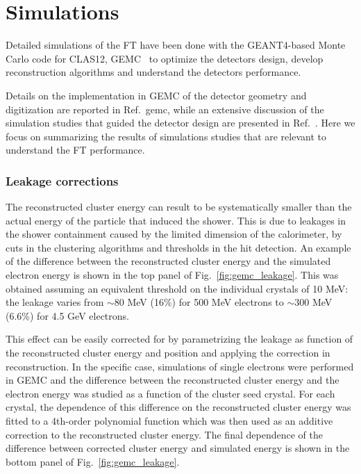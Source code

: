 \section{Simulations}

Detailed simulations of the FT have been done with the
GEANT4-based Monte Carlo code for CLAS12, GEMC~\cite{gemc} 
to optimize the detectors design, develop reconstruction algorithms and understand the detectors performance.

Details on the implementation in GEMC of the detector geometry and digitization are reported in Ref.~{gemc}, while an extensive discussion of the simulation studies that guided the detector design are presented in Ref.~\cite{ft-tdr}. Here we focus on summarizing the results of simulations studies that are relevant to understand the FT performance.

\subsubsection{Leakage corrections}
The reconstructed cluster energy can result to be systematically
smaller than the actual energy of the particle that induced the shower. This is due to leakages in the shower containment caused by the limited dimension of the calorimeter, by cuts in the clustering algorithms and thresholds in the hit detection. An example of the difference between the reconstructed cluster energy and the simulated electron energy is shown in the top panel of Fig.~\ref{fig:gemc_leakage}. This was obtained assuming an equivalent threshold on  the individual crystals of 10 MeV:
the leakage varies from $\sim 80$ MeV (16\%) for 500 MeV electrons to $\sim 300$ MeV (6.6\%) for 4.5 GeV electrons.

This effect can be easily corrected for by
parametrizing the leakage as function of the reconstructed cluster energy and position and applying the
correction in reconstruction. In the specific case, simulations of single electrons were performed in GEMC and the difference between the reconstructed cluster energy and the electron energy was studied as a function of the cluster seed crystal. For each crystal, the dependence of this difference on the reconstructed cluster energy was fitted to a 4th-order polynomial function which was then used as an additive correction to the reconstructed cluster energy. The final dependence
of the difference between corrected cluster energy and simulated
energy is shown in the bottom panel of Fig.~\ref{fig:gemc_leakage}.

